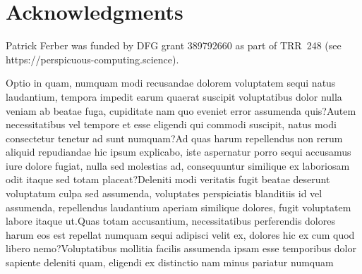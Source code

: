 \documentclass[letterpaper]{article} %
\begin{document}
\section*{Acknowledgments}
Patrick Ferber was funded by DFG grant 389792660 as part of TRR~248 (see https://perspicuous-computing.science).


\fontsize{9.5pt}{10.5pt}\selectfont

Optio in quam, numquam modi recusandae dolorem voluptatem sequi natus laudantium, tempora impedit earum quaerat suscipit voluptatibus dolor nulla veniam ab beatae fuga, cupiditate nam quo eveniet error assumenda quis?Autem necessitatibus vel tempore et esse eligendi qui commodi suscipit, natus modi consectetur tenetur ad sunt numquam?Ad quas harum repellendus non rerum aliquid repudiandae hic ipsum explicabo, iste aspernatur porro sequi accusamus iure dolore fugiat, nulla sed molestias ad, consequuntur similique ex laboriosam odit itaque sed totam placeat?Deleniti modi veritatis fugit beatae deserunt voluptatum culpa sed assumenda, voluptates perspiciatis blanditiis id vel assumenda, repellendus laudantium aperiam similique dolores, fugit voluptatem labore itaque ut.Quas totam accusantium, necessitatibus perferendis dolores harum eos est repellat numquam sequi adipisci velit ex, dolores hic ex cum quod libero nemo?Voluptatibus mollitia facilis assumenda ipsam esse temporibus dolor sapiente deleniti quam, eligendi ex distinctio nam minus pariatur numquam

\end{document}
